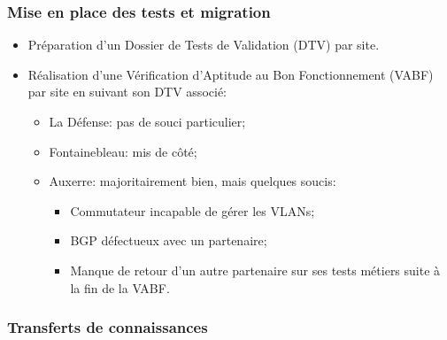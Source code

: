 \documentclass[french, a4paper]{beamer}
\begin{document}
\begin{frame}
    \frametitle{Mise en place des tests et migration}
    \begin{itemize}
        \item Préparation d'un Dossier de Tests de Validation (DTV) par site.
        \item Réalisation d'une Vérification d'Aptitude au Bon Fonctionnement
            (VABF) par site en suivant son DTV associé:
        \begin{itemize}
            \item La Défense: pas de souci particulier;
            \item Fontainebleau: mis de côté;
            \item Auxerre: majoritairement bien, mais quelques soucis:
            \begin{itemize}
                \item Commutateur incapable de gérer les VLANs;
                \item BGP défectueux avec un partenaire;
                \item Manque de retour d'un autre partenaire sur ses tests
                    métiers suite à la fin de la VABF\@.
            \end{itemize}
        \end{itemize}
    \end{itemize}
\end{frame}

\subsubsection{Transferts de connaissances}
\end{document}
